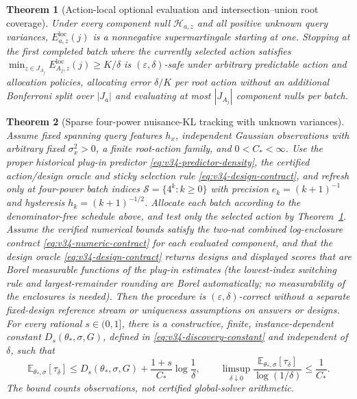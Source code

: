 \documentclass{article}
\theoremstyle{plain}
\newtheorem{theorem}{Theorem}[section]
\theoremstyle{definition}
\begin{document}
\begin{theorem}[Action-local optional evaluation and intersection--union root coverage]
\label{thm:v34-action-local}
Under every component null $\mathcal H_{a,z}$ and all positive unknown query variances, $E_{a,z}^{\mathrm{loc}}(j)$ is a nonnegative supermartingale starting at one. Stopping at the first completed batch where the currently selected action satisfies $\min_{z\in J_{A_j}}E_{A_j,z}^{\mathrm{loc}}(j)\ge K/\delta$ is $(\varepsilon,\delta)$-safe under arbitrary predictable action and allocation policies, allocating error $\delta/K$ per root action without an additional Bonferroni split over $|J_a|$ and evaluating at most $|J_{A_j}|$ component nulls per batch.
\end{theorem}

\begin{theorem}[Sparse four-power nuisance-KL tracking with unknown variances]
\label{thm:v34-adaptive}
Assume fixed spanning query features $h_x$, independent Gaussian observations
with arbitrary fixed $\sigma_x^2>0$, a finite root-action family, and
$0<C_*<\infty$. Use the proper historical plug-in predictor
\eqref{eq:v34-predictor-density}, the certified action/design oracle and
sticky selection rule \eqref{eq:v34-design-contract}, and refresh only at
four-power batch indices $\mathcal S=\{4^k:k\ge0\}$ with precision
$e_k=(k+1)^{-1}$ and hysteresis $h_k=(k+1)^{-1/2}$. Allocate each batch
according to the denominator-free schedule above, and test only the
selected action by Theorem~\ref{thm:v34-action-local}. Assume the
verified numerical bounds satisfy the two-nat combined log-enclosure
contract \eqref{eq:v34-numeric-contract} for each evaluated component,
and that the design oracle \eqref{eq:v34-design-contract} returns
designs and displayed scores that are Borel measurable functions of
the plug-in estimates (the lowest-index switching rule and
largest-remainder rounding are Borel automatically; no measurability
of the enclosures is needed).
Then the procedure is $(\varepsilon,\delta)$-correct without a separate
fixed-design reference stream or uniqueness assumptions on answers or
designs. For every rational $s\in(0,1]$, there is a constructive,
finite, instance-dependent constant $D_s(\theta_*,\sigma,G)$, defined
in \eqref{eq:v34-discovery-constant} and independent of $\delta$, such that
\begin{equation}
 \mathbb E_{\theta_*,\sigma}[\tau_\delta]
 \le D_s(\theta_*,\sigma,G)+\frac{1+s}{C_*}\log\frac1\delta,
 \qquad
 \limsup_{\delta\downarrow0}\frac{\mathbb E_{\theta_*,\sigma}[\tau_\delta]}{\log(1/\delta)}\le\frac1{C_*}.
 \label{eq:v34-sharp-rate}
\end{equation}
The bound counts observations, not certified global-solver arithmetic.
\end{theorem}
\end{document}
